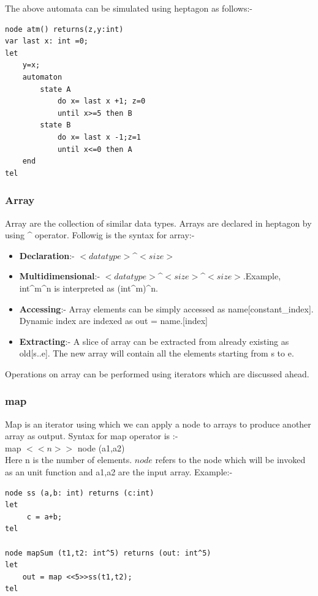 \documentclass[16pt]{report}
\begin{document}
The above automata can be simulated using heptagon as follows:-
\begin{verbatim}
node atm() returns(z,y:int)
var last x: int =0;
let
    y=x;	
    automaton
        state A
            do x= last x +1; z=0
            until x>=5 then B
        state B
            do x= last x -1;z=1
            until x<=0 then A
    end
tel
\end{verbatim}{}





\subsubsection{Array}
Array are the collection of similar data types. Arrays are declared in heptagon by using \^{} operator.
Followig is the syntax for array:-
\begin{itemize}
    \item \textbf{Declaration}:- $<datatype>$\^{}$<size>$
    \item \textbf{Multidimensional}:- $<datatype>$\^{}$<size>$\^{}$<size>$.Example, int\^{}m\^{}n is interpreted as (int\^{}m)\^{}n.
    \item \textbf{Accessing}:- Array elements can be simply accessed as name[constant\_index]. Dynamic index are indexed as out = name.[index]
    \item \textbf{Extracting}:-  A slice of array can be extracted from already existing as old[s..e]. The new array will contain all the elements starting from s to e.
\end{itemize}{}
Operations on array can be performed using iterators which are discussed ahead.

\subsubsection{map}
Map is an iterator using which we can apply a node to arrays to produce another array as output. Syntax for map operator is :-\\
map $<<n>>$ node (a1,a2)\\
Here n is the number of elements. $node$ refers to the node which will be invoked as an unit function and a1,a2 are the input array.
Example:-
\begin{verbatim}
node ss (a,b: int) returns (c:int)
let
     c = a+b;
tel

node mapSum (t1,t2: int^5) returns (out: int^5)
let
    out = map <<5>>ss(t1,t2);
tel
\end{verbatim}
\end{document}
